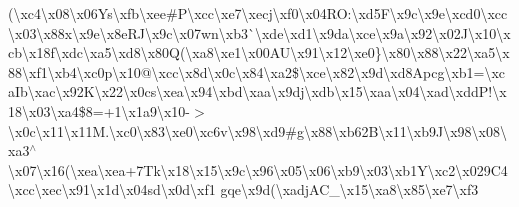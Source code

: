 (\textbackslash{}xc4\textbackslash{}x08\textbackslash{}x06\+Ys\textbackslash{}xfb\textbackslash{}xee\#\+P\textbackslash{}xcc\textbackslash{}xe7\textbackslash{}xecj\textbackslash{}xf0\textbackslash{}x04\+R\+O\+:\textbackslash{}xd5\+F\textbackslash{}x9c\textbackslash{}x9e\textbackslash{}xcd0\textbackslash{}xcc\textbackslash{}x03\textbackslash{}x88x\textbackslash{}x9e\textbackslash{}x8e\+R\+J\textbackslash{}x9c\textbackslash{}x07wn\textbackslash{}xb3\`{}\textquotesingle{}\textbackslash{}xde\textbackslash{}xd1\textbackslash{}x9da\textbackslash{}xce\textbackslash{}x9a\textbackslash{}x92\textbackslash{}x02\+J\textbackslash{}x10\textbackslash{}xcb\textbackslash{}x18f\textbackslash{}xdc\textbackslash{}xa5\textbackslash{}xd8\textbackslash{}x80\+Q(\textbackslash{}xa8\textbackslash{}xe1\textbackslash{}x00\+A\+U\textbackslash{}x91\textbackslash{}x12\textbackslash{}xe0\}\textbackslash{}x80\textbackslash{}x88\textbackslash{}x22\textbackslash{}xa5\textbackslash{}x88\textbackslash{}xf1\textbackslash{}xb4\textbackslash{}xc0p\textbackslash{}x10@\textbackslash{}xcc\textbackslash{}x8d\textbackslash{}x0c\textbackslash{}x84\textbackslash{}xa2\$\textbackslash{}xce\textbackslash{}x82\textbackslash{}x9d\textbackslash{}xd8\+Apcg\textbackslash{}xb1=\textbackslash{}xca\+Ib\textbackslash{}xac\textbackslash{}x92\+K\textbackslash{}x22\textbackslash{}x0cs\textbackslash{}xea\textbackslash{}x94\textbackslash{}xbd\textbackslash{}xaa\textbackslash{}x9dj\textbackslash{}xdb\textbackslash{}x15\textbackslash{}xaa\textbackslash{}x04\textbackslash{}xad\textbackslash{}xdd\+P!\textbackslash{}x18\textbackslash{}x03\textbackslash{}xa4\$8=+1\textbackslash{}x1a9\textbackslash{}x10-\/$>$\textbackslash{}x0c\textbackslash{}x11\textbackslash{}x11\+M.\textbackslash{}xc0\textbackslash{}x83\textbackslash{}xe0\textbackslash{}xc6v\textbackslash{}x98\textbackslash{}xd9\#g\textbackslash{}x88\textbackslash{}xb62\+B\textbackslash{}x11\textbackslash{}xb9\+J\textbackslash{}x98\textbackslash{}x08\textbackslash{}xa3$^\wedge$\textbackslash{}x07\textbackslash{}x16(\textbackslash{}xea\textbackslash{}xea+7\+Tk\textbackslash{}x18\textbackslash{}x15\textbackslash{}x9c\textbackslash{}x96\textbackslash{}x05\textbackslash{}x06\textbackslash{}xb9\textbackslash{}x03\textbackslash{}xb1\+Y\textbackslash{}xc2\textquotesingle{}\textbackslash{}x029\+C4\textbackslash{}xcc\textbackslash{}xec\textbackslash{}x91\textbackslash{}x1d\textbackslash{}x04sd\textbackslash{}x0d\textbackslash{}xf1 gqe\textbackslash{}x9d(\textbackslash{}xadj\+A\+C\+\_\+\textbackslash{}x15\textbackslash{}xa8\textbackslash{}x85\textbackslash{}xe7\textbackslash{}xf3 